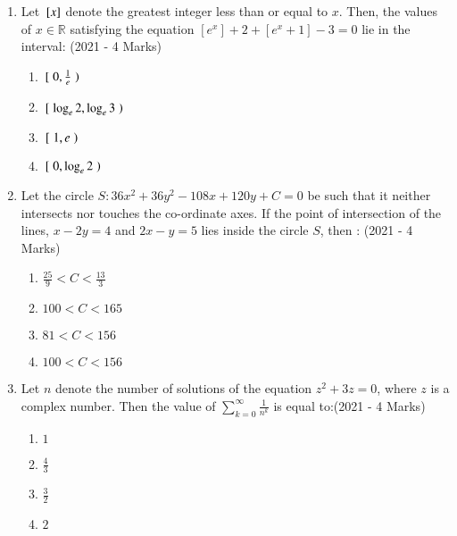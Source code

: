 \documentclass[journal]{IEEEtran}
\begin{document}
\begin{enumerate}
{}
\item{

Let ${}\left[x\right]$ denote the greatest integer less than or equal to $x$. Then, the values of $x \in \mathbb{R}$ satisfying the equation $[e^x] + 2 + [e^{x}+1] - 3 = 0$ lie in the interval:
\hfill
{(2021 - 4 Marks)}
\begin{multicols}{4}
\begin{enumerate}
\item ${}\left[\right.0, \frac{1}{e}\left.\right)$
\item ${}\left[\right. \log_e{2}, \log_e{3}\left.\right)$
\item ${}\left[\right.1, e\left.\right)$
\item ${}\left[\right.0, \log_e{2}\left.\right)$
\end{enumerate}
\end{multicols}

}
\item{

Let the circle $S: 36x^2 + 36y^2 - 108x + 120y + C = 0$ be such that it neither intersects nor touches the
co-ordinate axes. If the point of intersection of the lines, $x - 2y = 4$ and $2x - y = 5$ lies inside the
circle $S$, then :
\hfill
{(2021 - 4 Marks)}
\begin{multicols}{4}
\begin{enumerate}
\item $\frac{25}{9} < C < \frac{13}{3}$
\item $100 < C < 165$
\item $ 81 < C < 156$
\item $100 < C < 156$
\end{enumerate}
\end{multicols}

}
\item{
Let $n$ denote the number of solutions of the equation $z^2 + 3z = 0$, where $z$ is a complex number. Then the value of $\sum_{k=0}^{\infty} \frac{1}{n^k}$ is equal to:\hfill{(2021 - 4 Marks)}
\begin{multicols}{4}              
\begin{enumerate}
\item $1$
\item $\frac{4}{3}$
\item $\frac{3}{2}$
\item $2$
\end{enumerate}
\end{multicols}      
}
\end{enumerate}
\end{document}
